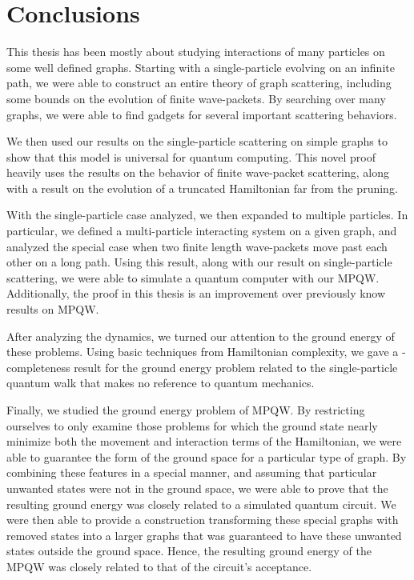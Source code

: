 \documentclass[../thesis-main/thesis-main]{subfiles}
\begin{document}
 
\chapter{Conclusions}
\label{chap:Conclusions}

This thesis has been mostly about studying interactions of many particles on some well defined graphs.  Starting with a single-particle evolving on an infinite path, we were able to construct an entire theory of graph scattering, including some bounds on the evolution of finite wave-packets.  By searching over many graphs, we were able to find gadgets for several important scattering behaviors.

We then used our results on the single-particle scattering on simple graphs to show that this model is universal for quantum computing.  This novel proof heavily uses the results on the behavior of finite wave-packet scattering, along with a result on the evolution of a truncated Hamiltonian far from the pruning.


With the single-particle case analyzed, we then expanded to multiple particles.  In particular, we defined a multi-particle interacting system on a given graph, and analyzed the special case when two finite length wave-packets move past each other on a long path.  Using this result, along with our result on single-particle scattering, we were able to simulate a quantum computer with our MPQW.  Additionally, the proof in this thesis is an improvement over previously know results on MPQW.

After analyzing the dynamics, we turned our attention to the ground energy of these problems.  Using basic techniques from Hamiltonian complexity, we gave a \QMA-completeness result for the ground energy problem related to the single-particle quantum walk that makes no reference to quantum mechanics.

Finally, we studied the ground energy problem of MPQW.  By restricting ourselves to only examine those problems for which the ground state nearly minimize both the movement and interaction terms of the Hamiltonian, we were able to guarantee the form of the ground space for a particular type of graph. By combining these features in a special manner, and assuming that particular unwanted states were not in the ground space, we were able to prove that the resulting ground energy was closely related to a simulated quantum circuit.   We were then able to provide a construction transforming these special graphs with removed states into a larger graphs that was guaranteed to have these unwanted states outside the ground space.  Hence, the resulting ground energy of the MPQW was closely related to that of the circuit's acceptance.
\end{document}
